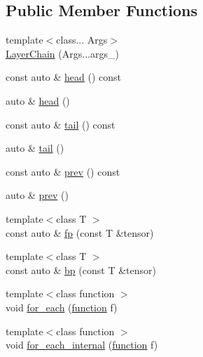 \subsection*{Public Member Functions}
\begin{DoxyCompactItemize}
\item 
{\footnotesize template$<$class... Args$>$ }\\\hyperlink{structBC_1_1nn_1_1LayerChain_3_01index_00_01derived_00_01output__layer__t_01_4_a1f3e4deee5015ce211cbabf6686df39e}{Layer\+Chain} (Args...\+args\+\_\+)
\item 
const auto \& \hyperlink{structBC_1_1nn_1_1LayerChain_3_01index_00_01derived_00_01output__layer__t_01_4_a45703a53d4faef145b9415aafa4de6bc}{head} () const 
\item 
auto \& \hyperlink{structBC_1_1nn_1_1LayerChain_3_01index_00_01derived_00_01output__layer__t_01_4_af03d490a35a8108cbbdf0774a44970d7}{head} ()
\item 
const auto \& \hyperlink{structBC_1_1nn_1_1LayerChain_3_01index_00_01derived_00_01output__layer__t_01_4_ad07637db6468c9ee0507dff83b965768}{tail} () const 
\item 
auto \& \hyperlink{structBC_1_1nn_1_1LayerChain_3_01index_00_01derived_00_01output__layer__t_01_4_a8e90e96647686b319532ece4349c1ade}{tail} ()
\item 
const auto \& \hyperlink{structBC_1_1nn_1_1LayerChain_3_01index_00_01derived_00_01output__layer__t_01_4_aee5f69966885acb2b2fc5336fa6df86c}{prev} () const 
\item 
auto \& \hyperlink{structBC_1_1nn_1_1LayerChain_3_01index_00_01derived_00_01output__layer__t_01_4_a97cd3ba51b8fceb2547dedfaa9406a65}{prev} ()
\item 
{\footnotesize template$<$class T $>$ }\\const auto \& \hyperlink{structBC_1_1nn_1_1LayerChain_3_01index_00_01derived_00_01output__layer__t_01_4_a2c4b3c307a4db694f01b4dd9effee817}{fp} (const T \&tensor)
\item 
{\footnotesize template$<$class T $>$ }\\const auto \& \hyperlink{structBC_1_1nn_1_1LayerChain_3_01index_00_01derived_00_01output__layer__t_01_4_a39c4ee1723c1a2c5dc191ad497a3b4d0}{bp} (const T \&tensor)
\item 
{\footnotesize template$<$class function $>$ }\\void \hyperlink{structBC_1_1nn_1_1LayerChain_3_01index_00_01derived_00_01output__layer__t_01_4_a219a237d17314f8ab04215a0fe9da8a8}{for\+\_\+each} (\hyperlink{namespaceBC_1_1nn_a5429ceaa392776ade7234175af39050d}{function} f)
\item 
{\footnotesize template$<$class function $>$ }\\void \hyperlink{structBC_1_1nn_1_1LayerChain_3_01index_00_01derived_00_01output__layer__t_01_4_a53d8aa7b2a37ee1930c2fb2405bd42f6}{for\+\_\+each\+\_\+internal} (\hyperlink{namespaceBC_1_1nn_a5429ceaa392776ade7234175af39050d}{function} f)
\end{DoxyCompactItemize}
